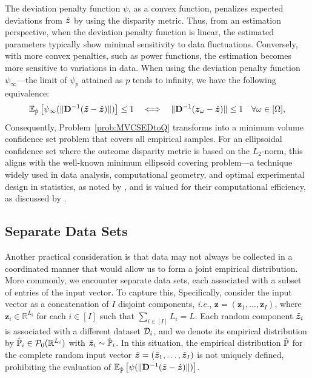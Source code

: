 \documentclass[opre, nonblindrev]{informswp}
\newcommand{\1}[1]{\mathds{1}{\left(#1\right)}}
\begin{document}
The deviation penalty function $\psi$, as a convex function, penalizes expected deviations from $\hat{\bm{z}}$ by using the disparity metric. Thus, from an estimation perspective, when the deviation penalty function is linear, the estimated parameters typically show minimal sensitivity to data fluctuations. Conversely, with more convex penalties, such as power functions, the estimation becomes more sensitive to variations in data. When using the deviation penalty function $\psi_\infty$---the limit of $\psi_p$ attained as $p$ tends to infinity, we have the following equivalence:
$$
\mathbb{E}_{\hat{\mathbb{P}}}\left[\psi_\infty(\|{\mathbf{D}}^{-1}( \tilde{\bm{z}} - \hat{\bm{z}} )\|)\right] \leq 1
~~~\Longleftrightarrow~~~
\|{\mathbf{D}}^{-1}( \bm z_{\omega} - \hat{\bm{z}} )\| \leq 1 ~~~\forall \omega \in [\Omega], 
$$
Consequently, Problem~\eqref{prob:MVCSEDtoQ} transforms into a minimum volume confidence set problem that covers all empirical samples. For an ellipsoidal confidence set where the outcome disparity metric is based on the $L_2$-norm, this aligns with the well-known minimum ellipsoid covering problem---a technique widely used in data analysis, computational geometry, and optimal experimental design in statistics, as noted by \cite{todd2016minimum}, and is valued for their computational efficiency, as discussed by \cite{sun2004computation}.

\subsection*{Separate Data Sets}
Another practical consideration is that data may not always be collected in a coordinated manner that would allow us to form a joint empirical distribution. More commonly, we encounter separate data sets, each associated with a subset of entries of the input vector. To capture this, Specifically, consider the input vector as a concatenation of $I$ disjoint components, \textit{i.e.}, $\bm z = (\bm z_1, \dots, \bm z_I)$, where $\bm z_i \in \mathbb{R}^{L_i}$ for each $i \in [I]$ such that $\sum_{i \in [I]}L_i = L$. Each random component $\tilde{\bm{z}}_i$ is associated with a different dataset $\mathcal{D}_i$, and we denote its empirical distribution by $\hat{\mathbb{P}}_i \in \mathcal{P}_0(\mathbb{R}^{L_i})$ with $\tilde{\bm{z}}_i \sim \hat{\mathbb{P}}_i$. In this situation, the empirical distribution $\hat{\mathbb{P}}$ for the complete random input vector $\tilde{\bm{z}} = (\tilde{\bm{z}}_1, \dots, \tilde{\bm{z}}_I)$ is not uniquely defined, prohibiting the evaluation of $\mathbb{E}_{\hat{\mathbb{P}}}\left[\psi(\|{\mathbf{D}}^{-1}(\tilde{\bm{z}} - \hat{\bm{z}})\|)\right]$.
\end{document}
